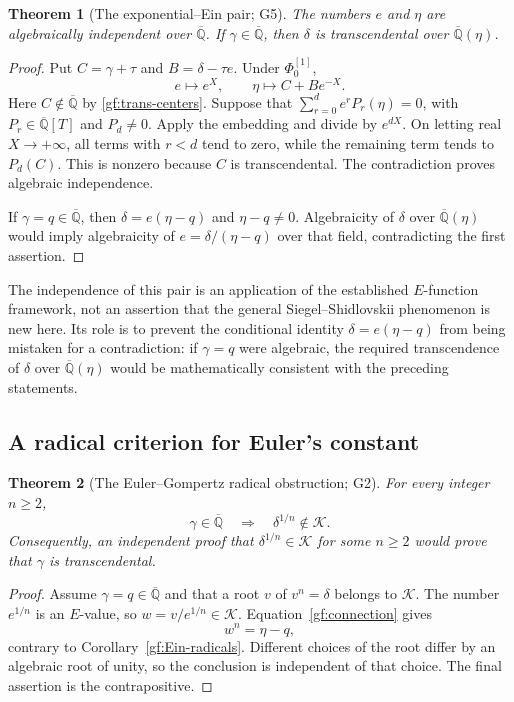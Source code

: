 \documentclass[11pt,a4paper]{article}
\numberwithin{equation}{section}
\newtheorem{theorem}{Theorem}[section]
\theoremstyle{definition}
\theoremstyle{remark}
\newcommand{\A}{\overline{\mathbb Q}}
\newcommand{\K}{\mathcal K}
\begin{document}
\begin{theorem}[The exponential--Ein pair; G5]\label{gf:epair}
The numbers $e$ and $\eta$ are algebraically independent over $\A$.
If $\gamma\in\A$, then $\delta$ is transcendental over $\A(\eta)$.
\end{theorem}
\begin{proof}
Put $C=\gamma+\tau$ and $B=\delta-\tau e$.  Under $\Phi_0^{[1]}$,
\[
 e\longmapsto e^X,
 \qquad \eta\longmapsto C+Be^{-X}.
\]
Here $C\notin\A$ by \eqref{gf:trans-centers}.  Suppose that
$\sum_{r=0}^d e^r P_r(\eta)=0$, with $P_r\in\A[T]$ and
$P_d\ne0$.  Apply the embedding and divide by $e^{dX}$.  On letting
real $X\to+\infty$, all terms with $r<d$ tend to zero, while the
remaining term tends to $P_d(C)$.  This is nonzero because $C$ is
transcendental.  The contradiction proves algebraic independence.

If $\gamma=q\in\A$, then $\delta=e(\eta-q)$ and $\eta-q\ne0$.
Algebraicity of $\delta$ over $\A(\eta)$ would imply algebraicity of
$e=\delta/(\eta-q)$ over that field, contradicting the first assertion.
\end{proof}

The independence of this pair is an application of the established
$E$-function framework, not an assertion that the general
Siegel--Shidlovskii phenomenon is new here.  Its role is to prevent the
conditional identity $\delta=e(\eta-q)$ from being mistaken for a
contradiction: if $\gamma=q$ were algebraic, the required transcendence
of $\delta$ over $\A(\eta)$ would be mathematically consistent with
the preceding statements.

\subsection{A radical criterion for Euler's constant}
\label{gf:radical-criterion}

\begin{theorem}[The Euler--Gompertz radical obstruction; G2]
\label{gf:delta-roots}
For every integer $n\ge2$,
\begin{equation}\label{gf:delta-roots-equation}
 \gamma\in\A\quad\Longrightarrow\quad\delta^{1/n}\notin\K.
\end{equation}
Consequently, an independent proof that $\delta^{1/n}\in\K$ for
some $n\ge2$ would prove that $\gamma$ is transcendental.
\end{theorem}
\begin{proof}
Assume $\gamma=q\in\A$ and that a root $v$ of $v^n=\delta$ belongs
to $\K$.  The number $e^{1/n}$ is an $E$-value, so
$w=v/e^{1/n}\in\K$.  Equation~\eqref{gf:connection} gives
\[
 w^n=\eta-q,
\]
contrary to Corollary~\ref{gf:Ein-radicals}.  Different choices of the
root differ by an algebraic root of unity, so the conclusion is
independent of that choice.  The final assertion is the contrapositive.
\end{proof}
\end{document}
